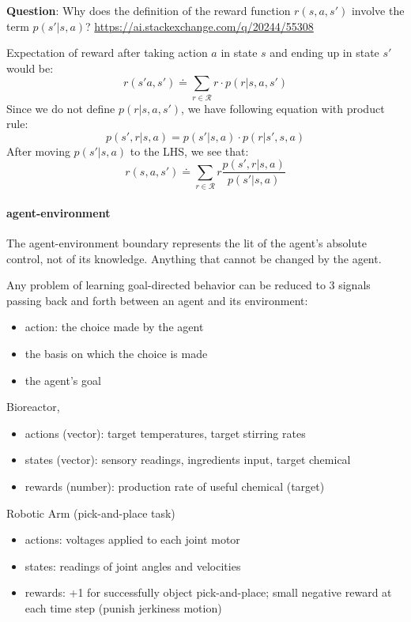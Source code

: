 \documentclass[lang=en,mode=geye,device=normal,color=blue,14pt]{elegantnote}
\DeclareMathOperator*{\1}{\mathbbm{1}}
\begin{document}
\textbf{Question}: Why does the definition of the reward function $r(s,a,s')$ involve the term $p(s'|s,a)$? \url{https://ai.stackexchange.com/q/20244/55308}

Expectation of reward after taking action $a$ in state $s$ and ending up in state $s'$ would be:
$$ r(s'a,s') \doteq \sum_{r\in \mathcal{R}} r \cdot p(r|s,a,s') $$
Since we do not define $p(r|s,a,s')$, we have following equation with product rule:
$$ p(s',r|s,a) = p(s'|s,a) \cdot p(r|s',s,a) $$
After moving $p(s'|s,a)$ to the LHS, we see that:
$$ r(s,a,s') \doteq \sum_{r \in \mathcal{R}} r \frac{p(s',r|s,a)}{p(s'|s,a)} $$



\paragraph{agent-environment}
The agent-environment boundary represents the lit of the agent's absolute control, not of its knowledge. Anything that cannot be changed by the agent.

Any problem of learning goal-directed behavior can be reduced to 3 signals passing back and forth between an agent and its environment:
\begin{itemize}
\item action: the choice made by the agent
\item the basis on which the choice is made
\item the agent's goal
\end{itemize}

\begin{example}
Bioreactor,

\begin{itemize}
\item actions (vector): target temperatures, target stirring rates
\item states (vector): sensory readings, ingredients input, target chemical
\item rewards (number): production rate of useful chemical (target)
\end{itemize}

\end{example}

\begin{example}
Robotic Arm (pick-and-place task)

\begin{itemize}
\item actions: voltages applied to each joint motor
\item states: readings of joint angles and velocities
\item rewards: +1 for successfully object pick-and-place; small negative reward at each time step (punish jerkiness motion)
\end{itemize}
\end{example}
\end{document}
